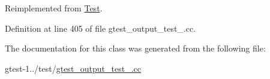 \-Reimplemented from \hyperlink{classtesting_1_1Test_a931587596081ef8178c2b128facb0411}{\-Test}.



\-Definition at line 405 of file gtest\-\_\-output\-\_\-test\-\_\-.\-cc.




\-The documentation for this class was generated from the following file\-:\begin{DoxyCompactItemize}
\item 
gtest-\/1../test/\hyperlink{gtest__output__test___8cc}{gtest\-\_\-output\-\_\-test\-\_\-.\-cc}\end{DoxyCompactItemize}
